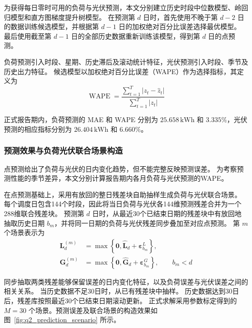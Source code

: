 为获得每日零时可用的负荷与光伏预测，本文分别建立历史时段中位数模型、岭回归模型和直方图梯度提升树模型\cite{ref6}。
在预测第 \(d\) 日时，首先使用不晚于第 \(d-2\) 日的数据训练候选模型，并根据第 \(d-1\) 日的加权绝对百分比误差选择最优模型。
最后使用截至第 \(d-1\) 日的全部历史数据重新训练该模型，得到第 \(d\) 日的点预测。

负荷预测引入时段、星期、历史滞后及滚动统计特征，光伏预测引入时段、季节及历史出力特征。
候选模型以加权绝对百分比误差（WAPE）作为选择指标，其定义为
\begin{equation}
    \operatorname{WAPE}
    =
    \frac{\displaystyle\sum_{t=1}^{T}
    \left|z_t-\hat z_t\right|}
    {\displaystyle\sum_{t=1}^{T}\left|z_t\right|}
    \label{eq:q2_wape}
\end{equation}

正式报告期内，负荷预测的 MAE 和 WAPE 分别为
\(25.658\,\mathrm{kWh}\) 和 \(3.335\%\)，光伏预测的相应指标分别为
\(26.404\,\mathrm{kWh}\) 和 \(6.660\%\)。

\subsubsection{预测效果与负荷光伏联合场景构造}

点预测给出了负荷与光伏的日内变化趋势，但不能完整反映预测误差。
为考察预测性能的季节差异，本文分别计算报告期内各月负荷与光伏预测的WAPE。

在点预测基础上，采用有放回的整日残差块自助抽样生成负荷与光伏联合场景\cite{ref5}。
每个调度日包含144个时段，因此将当日负荷与光伏各144维预测残差合并为一个288维联合残差块。
预测第 \(d\) 日时，从最近30个已结束日期的残差块中有放回地抽取历史日期 \(b_m\)，并将同一日期的负荷与光伏残差同步叠加至对应点预测。
第 \(m\) 个场景表示为
\begin{equation}
\begin{aligned}
    \boldsymbol{L}_d^{(m)}
    &=
    \max\left\{
    \boldsymbol{0},
    \widehat{\boldsymbol{L}}_d+
    \boldsymbol{\varepsilon}_{b_m}^{L}
    \right\},\\
    \boldsymbol{G}_d^{(m)}
    &=
    \max\left\{
    \boldsymbol{0},
    \widehat{\boldsymbol{G}}_d+
    \boldsymbol{\varepsilon}_{b_m}^{G}
    \right\},
    \qquad b_m<d
\end{aligned}
\label{eq:q2_joint_scenario}
\end{equation}

同步抽取两类残差能够保留误差的日内变化特征，以及负荷误差与光伏误差之间的相关关系。
当历史数据不足30日时，从已有残差块中抽样。
历史数据达到30日后，残差库按照最近30个已结束日期滚动更新。
正式求解采用参数标定得到的 \(M=30\) 个场景。预测误差及联合场景的构造效果如图~\ref{fig:q2_prediction_scenario} 所示。

